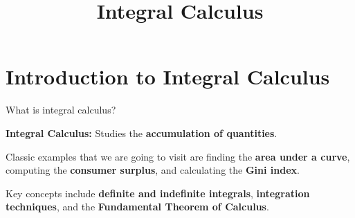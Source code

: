 \documentclass[9pt]{beamer}
\title{\Huge Integral Calculus}
\begin{document}
\maketitle


\section{Introduction to Integral Calculus}

\begin{frame}{What is integral calculus?}

    \textbf{Integral Calculus:} Studies the \textbf{accumulation of quantities}.
    \vspace{0.3cm}

    Classic examples that we are going to visit are finding the \textbf{area under a curve}, computing the \textbf{consumer surplus}, and calculating the \textbf{Gini index}. 
    \vspace{0.3cm}
    
    Key concepts include \textbf{definite and indefinite integrals}, \textbf{integration techniques}, and the \textbf{Fundamental Theorem of Calculus}.
    
\end{frame}
\end{document}
